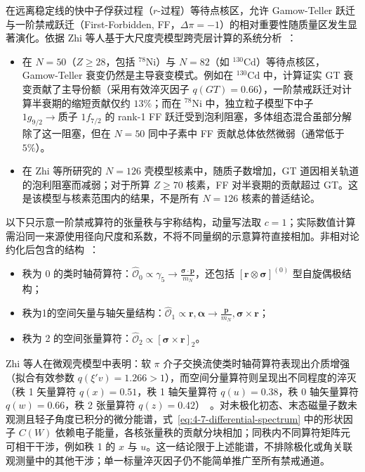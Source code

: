 在远离稳定线的快中子俘获过程（$r$-过程）等待点核区，允许 Gamow-Teller 跃迁与一阶禁戒跃迁（First-Forbidden, FF，$\Delta \pi = -1$）的相对重要性随质量区发生显著演化。依据 Zhi 等人基于大尺度壳模型跨壳层计算的系统分析~\cite{doctoral-r1-g34-zhi-2013-prc-shell-model-half-lives}：
\begin{itemize}
\item 在 $N=50$（$Z \ge 28$，包括 $^{78}\mathrm{Ni}$）与 $N=82$（如 $^{130}\mathrm{Cd}$）等待点核区，Gamow-Teller 衰变仍然是主导衰变模式。例如在 $^{130}\mathrm{Cd}$ 中，计算证实 GT 衰变贡献了主导份额（采用有效淬灭因子 $q(GT) = 0.66$），一阶禁戒跃迁对计算半衰期的缩短贡献仅约 $13\%$；而在 $^{78}\mathrm{Ni}$ 中，独立粒子模型下中子 $1g_{9/2} \to \text{质子 } 1f_{7/2}$ 的 rank-1 FF 跃迁受到泡利阻塞，多体组态混合虽部分解除了这一阻塞，但在 $N=50$ 同中子素中 FF 贡献总体依然微弱（通常低于 $5\%$）。
\item 在 Zhi 等所研究的 $N=126$ 壳模型核素中，随质子数增加，GT 道因相关轨道的泡利阻塞而减弱；对于所算 $Z \ge 70$ 核素，FF 对半衰期的贡献超过 GT。这是该模型与核素范围内的结果，不是所有 $N=126$ 核素的普适结论。
\end{itemize}
以下只示意一阶禁戒算符的张量秩与宇称结构，动量写法取 $c=1$；实际数值计算需沿同一来源使用径向尺度和系数，不将不同量纲的示意算符直接相加。非相对论约化后包含的结构~\cite{doctoral-r1-g34-zhi-2013-prc-shell-model-half-lives}：
\begin{itemize}
\item 秩为 0 的类时轴荷算符：$\hat{\mathcal{O}}_0 \propto \gamma_5 \to \frac{\boldsymbol{\sigma} \cdot \mathbf{p}}{m_N}$，还包括 $[\mathbf r\otimes\boldsymbol\sigma]^{(0)}$ 型自旋偶极结构；
\item 秩为1的空间矢量与轴矢量结构：$\hat{\mathcal{O}}_1 \propto \mathbf{r}, \boldsymbol{\alpha} \to \frac{\mathbf{p}}{m_N}, \boldsymbol{\sigma}\times\mathbf{r}$；
\item 秩为 2 的空间张量算符：$\hat{\mathcal{O}}_2 \propto [\boldsymbol{\sigma} \times \mathbf{r}]_2$。
\end{itemize}
Zhi 等人在微观壳模型中表明：软 $\pi$ 介子交换流使类时轴荷算符表现出介质增强（拟合有效参数 $q(\xi' v) = 1.266 > 1$），而空间分量算符则呈现出不同程度的淬灭（秩 1 矢量算符 $q(x) = 0.51$，秩 1 轴矢量算符 $q(u) = 0.38$，秩 0 轴矢量算符 $q(w) = 0.66$，秩 2 张量算符 $q(z) = 0.42$）~\cite{doctoral-r1-g34-zhi-2013-prc-shell-model-half-lives}。对未极化初态、末态磁量子数未观测且轻子角度已积分的微分能谱，式~\eqref{eq:4-7-differential-spectrum} 中的形状因子 $C(W)$ 依赖电子能量，各核张量秩的贡献分块相加；同秩内不同算符矩阵元可相干干涉，例如秩 1 的 $x$ 与 $u$。这一结论限于上述能谱，不排除极化或角关联观测量中的其他干涉；单一标量淬灭因子仍不能简单推广至所有禁戒通道。

